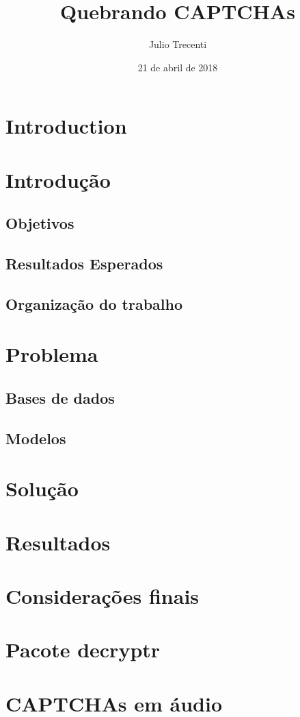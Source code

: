 \documentclass[12pt,]{report}
\title{Quebrando CAPTCHAs}
\author{Julio Trecenti}
\date{21 de abril de 2018}
\begin{document}
\maketitle

{
\hypersetup{linkcolor=black}
\setcounter{tocdepth}{2}
\tableofcontents
}
\listoftables
\listoffigures
\chapter{Introduction}\label{introduction}

\chapter{Introdução}\label{introducao}

\section{Objetivos}\label{objetivos}

\section{Resultados Esperados}\label{resultados-esperados}

\section{Organização do trabalho}\label{organizacao-do-trabalho}

\chapter{Problema}\label{problema}

\section{Bases de dados}\label{bases-de-dados}

\section{Modelos}\label{modelos}

\chapter{Solução}\label{solucao}

\chapter{Resultados}\label{resultados}

\chapter{Considerações finais}\label{consideracoes-finais}

\chapter{Pacote decryptr}\label{pacote-decryptr}

\chapter{CAPTCHAs em áudio}\label{captchas-em-audio}


\end{document}
